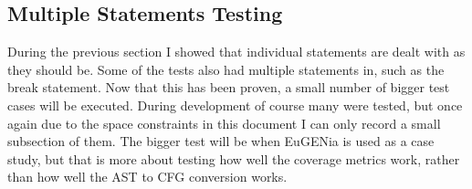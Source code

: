 \subsection{Multiple Statements Testing}

During the previous section I showed that individual statements are dealt with as they should be. Some of the tests also had multiple statements in, such as the break statement. Now that this has been proven, a small number of bigger test cases will be executed. During development of course many were tested, but once again due to the space constraints in this document I can only record a small subsection of them. The bigger test will be when EuGENia is used as a case study, but that is more about testing how well the coverage metrics work, rather than how well the AST to CFG conversion works.

